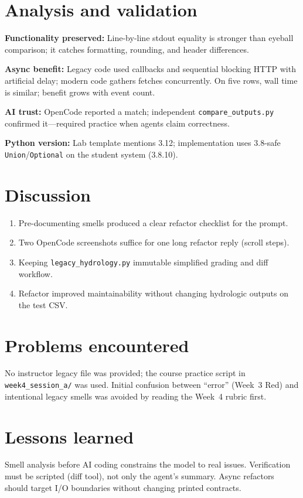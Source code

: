 \documentclass[11pt,a4paper]{article}
\begin{document}
\section{Analysis and validation}

\textbf{Functionality preserved:} Line-by-line stdout equality is stronger than eyeball comparison; it catches formatting, rounding, and header differences.

\textbf{Async benefit:} Legacy code used callbacks and sequential blocking HTTP with artificial delay; modern code gathers fetches concurrently. On five rows, wall time is similar; benefit grows with event count.

\textbf{AI trust:} OpenCode reported a match; independent \texttt{compare\_outputs.py} confirmed it---required practice when agents claim correctness.

\textbf{Python version:} Lab template mentions 3.12; implementation uses 3.8-safe \texttt{Union}/\texttt{Optional} on the student system (3.8.10).

\section{Discussion}
\begin{enumerate}[noitemsep]
  \item Pre-documenting smells produced a clear refactor checklist for the prompt.
  \item Two OpenCode screenshots suffice for one long refactor reply (scroll steps).
  \item Keeping \texttt{legacy\_hydrology.py} immutable simplified grading and diff workflow.
  \item Refactor improved maintainability without changing hydrologic outputs on the test CSV.
\end{enumerate}

\section{Problems encountered}
No instructor legacy file was provided; the course practice script in \texttt{week4\_session\_a/} was used. Initial confusion between ``error'' (Week~3 Red) and intentional legacy smells was avoided by reading the Week~4 rubric first.

\section{Lessons learned}
Smell analysis before AI coding constrains the model to real issues. Verification must be scripted (diff tool), not only the agent's summary. Async refactors should target I/O boundaries without changing printed contracts.
\end{document}
